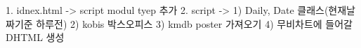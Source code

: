 1. idnex.html -> script modul tyep 추가
2. script -> 
	1) Daily, Date 클래스(현재날짜기준 하루전)
	2) kobis 박스오피스
	3) kmdb poster 가져오기 
	4) 무비차트에 들어갈 DHTML 생성
